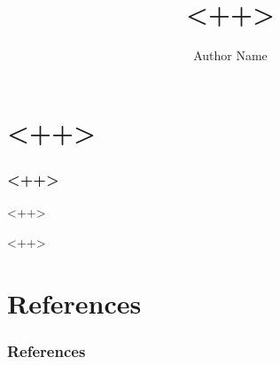\documentclass{beamer}
\title{<++>}
\author{Author Name}
\institute{University of Arizona}
\begin{document}
\ttfamily
\begin{frame}

\maketitle

\end{frame}

\section{<++>}

\begin{frame}
\frametitle{<++>}

<++>

\end{frame}

<++>

\section{References}

\begin{frame}
\frametitle{References}
\printbibliography
\end{frame}
\end{document}
